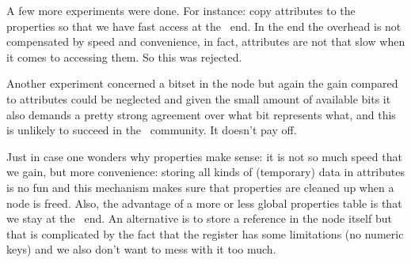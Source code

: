 A few more experiments were done. For instance: copy attributes to the properties
so that we have fast access at the \LUA\ end. In the end the overhead is not
compensated by speed and convenience, in fact, attributes are not that slow when
it comes to accessing them. So this was rejected.

Another experiment concerned a bitset in the node but again the gain compared to
attributes could be neglected and given the small amount of available bits it also
demands a pretty strong agreement over what bit represents what, and this is
unlikely to succeed in the \TEX\ community. It doesn't pay off.

Just in case one wonders why properties make sense: it is not so much speed that
we gain, but more convenience: storing all kinds of (temporary) data in attributes
is no fun and this mechanism makes sure that properties are cleaned up when a
node is freed. Also, the advantage of a more or less global properties table is
that we stay at the \LUA\ end. An alternative is to store a reference in the node
itself but that is complicated by the fact that the register has some limitations
(no numeric keys) and we also don't want to mess with it too much.

\stopsubsection

\stopsection

\stopdocument
